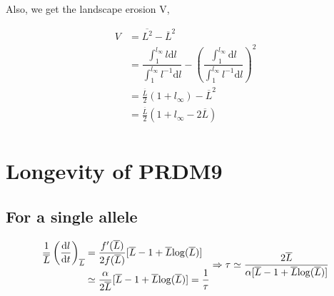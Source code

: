 \documentclass{article}
\begin{document}
Also, we get the landscape erosion V,

\begin{equation}
  \begin{aligned}
    V &=  \overline{L^2} - \overline{L}^2 \\
    &= \dfrac{ \int_{1}^{l_{\infty}} l \mathrm{d} l  }{ \int_{1}^{l_{\infty}} l^{-1} \mathrm{d} l } - \left( \dfrac{ \int_{1}^{l_{\infty}} \mathrm{d} l  }{ \int_{1}^{l_{\infty}} l^{-1} \mathrm{d} l } \right)^2
    \\
    &= \frac{\overline{L}}{2}  \left(1 + l_{\infty}\right) - \overline{L}^2
    \\
    &= \frac{\overline{L}}{2}  \left(1 + l_{\infty} - 2 \overline{L}\right)
    \\
  \end{aligned}
\end{equation}

\section{Longevity of PRDM9}
\subsection{For a single allele}

\begin{equation}
  \begin{aligned}
    \dfrac{1}{\overline{L}} \left( \dfrac{\mathrm{d}l}{\mathrm{d}t} \right)_{\overline{L}}
    &= \dfrac{f'(\overline{L})}{2 f(\overline{L})} [ \overline{L}-1 + \overline{L} \mathrm{log}(\overline{L})] \\
    &\simeq \dfrac{\alpha}{2 \overline{L}}[\overline{L}-1 + \overline{L} \mathrm{log}(\overline{L})] = \dfrac{1}{\tau} \\
  \end{aligned} \\
  \Rightarrow \tau \simeq \dfrac{2 \overline{L}}{\alpha[\overline{L}-1 + \overline{L} \mathrm{log}(\overline{L})]}
\end{equation}


\end{document}
